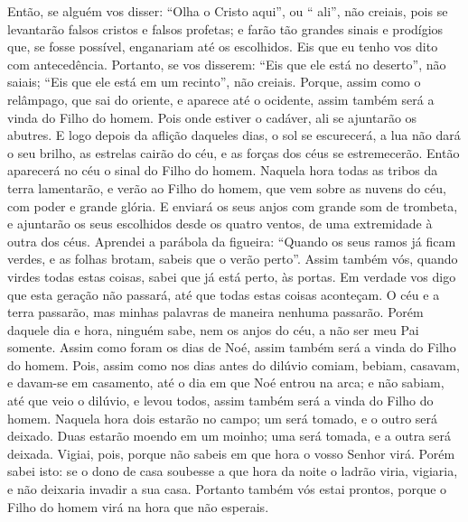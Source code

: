 {  Então, se alguém vos disser: “Olha o Cristo aqui”, ou “
{} ali”, não creiais,
  pois se levantarão falsos cristos e falsos profetas; e farão tão grandes sinais e prodígios que, se fosse possível, enganariam até os escolhidos.
  Eis que eu tenho vos dito com antecedência.
  Portanto, se vos disserem: “Eis que ele está no deserto”, não saiais; “Eis que ele está em um recinto”, não creiais.
  Porque, assim como o relâmpago, que sai do oriente, e aparece até o ocidente, assim também será a vinda do Filho do homem.
  Pois onde estiver o cadáver, ali se ajuntarão os abutres.
  E logo depois da aflição
 daqueles dias, o sol se escurecerá, a lua não dará o seu brilho, as estrelas cairão do céu, e as forças dos céus se estremecerão.
  Então aparecerá no céu o sinal do Filho do homem. Naquela hora todas as tribos da terra lamentarão, e verão ao Filho do homem, que vem sobre as nuvens do céu, com poder e grande glória.
  E enviará os seus anjos com grande som de trombeta, e ajuntarão os seus escolhidos desde os quatro ventos, de uma extremidade à outra dos céus.
  Aprendei a parábola da figueira: “Quando os seus ramos já ficam verdes, e as folhas brotam, sabeis que o verão
{} perto”.
  Assim também vós, quando virdes todas estas coisas, sabei que já está perto, às portas.
  Em verdade vos digo que esta geração não passará, até que todas estas coisas aconteçam.
  O céu e a terra passarão, mas minhas palavras de maneira nenhuma passarão.
  Porém daquele dia e hora, ninguém sabe, nem os anjos do céu, a não ser meu Pai somente.
  Assim como foram os dias de Noé, assim também será a vinda do Filho do homem.
  Pois, assim como nos dias antes do dilúvio comiam, bebiam, casavam, e davam-se em casamento, até o dia em que Noé entrou na arca;
  e não sabiam, até que veio o dilúvio, e levou todos, assim também será a vinda do Filho do homem.
  Naquela hora dois estarão no campo; um será tomado, e o outro será deixado.
  Duas estarão moendo em um moinho; uma será tomada, e a outra será deixada.
  Vigiai, pois, porque não sabeis em que hora o vosso Senhor virá.
  Porém sabei isto: se o dono de casa soubesse a que hora
 da noite o ladrão viria, vigiaria, e não deixaria invadir a sua casa.
  Portanto também vós estai prontos, porque o Filho do homem virá na hora que não esperais.
}
